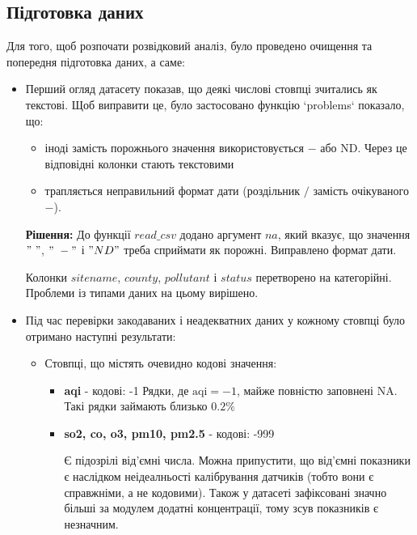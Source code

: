 \documentclass[./report.tex]{subfiles}
\begin{document}
\subsection{Підготовка даних}

Для того, щоб розпочати розвідковий аналіз, було проведено очищення та попередня підготовка даних, а саме:

\begin{itemize}
    \item Перший огляд датасету показав, що деякі числові стовпці зчитались як текстові.
    Щоб виправити це, було застосовано функцію `problems` показало, що:

      \begin{itemize}
        \item іноді замість порожнього значення використовується $-$ або ND.
        Через це відповідні колонки стають текстовими
        \item трапляється неправильний формат дати (роздільник $/$ замість очікуваного $-$).
      \end{itemize}

   \textbf{Рішення:} До функції $read\_csv$ додано аргумент $na$, який вказує, що значення
   $" \ "$, $"\ -"$ і $"ND"$ треба сприймати як порожні. Виправлено формат дати.

   Колонки $sitename$, $county$, $pollutant$ і $status$ перетворено на категорійні.
   Проблеми із типами даних на цьому вирішено.

   \newpage

    \item Під час перевірки закодаваних і неадекватних даних у кожному стовпці було отримано наступні результати:
      \begin{itemize}
        \item Стовпці, що містять очевидно кодові значення:
        \begin{itemize}
          \item \textbf{aqi} - кодові: -1
          Рядки, де $\text{aqi} = -1$, майже повністю заповнені NA. Такі рядки займають близько $0.2\%$
          \item \textbf{so2, co, o3, pm10, pm2.5} - кодові: -999

          Є підозрілі від'ємні числа. Можна припустити, що від'ємні показники є наслідком
          неідеалньості калібрування датчиків (тобто вони є справжніми, а не кодовими).
          Також у датасеті зафіксовані значно більші за модулем додатні концентрації,
          тому зсув показників є незначним.


\end{itemize}
\end{itemize}
\end{itemize}
\end{document}
